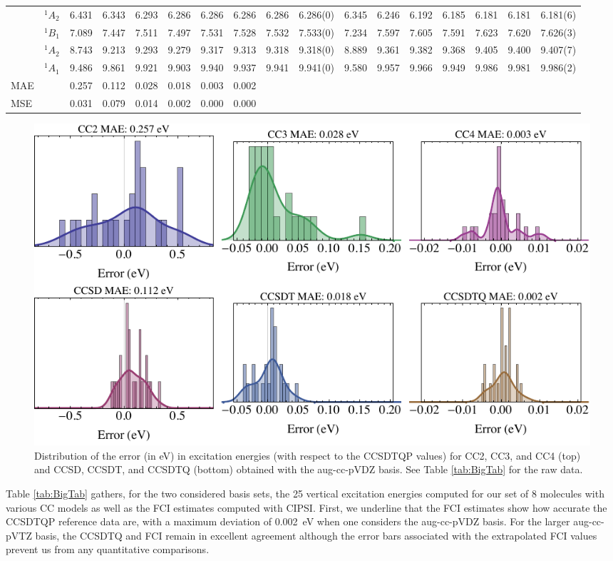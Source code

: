 \documentclass[aip,jcp,reprint,noshowkeys,superscriptaddress]{revtex4-1}
\begin{document}
\begin{squeezetable}
\begin{table}
\begin{ruledtabular}
\begin{tabular}{llrrrrrrrrrrrrrrr}
				&	$^1A_2$  		&6.431	&6.343	&6.293	&6.286	&6.286	&6.286	&6.286	&6.286(0)	&6.345	&6.246	&6.192	&6.185	&6.181	&6.181	&6.181(6) \\
	\ce{H2O}	&	$^1B_1$  		&7.089	&7.447	&7.511	&7.497	&7.531	&7.528	&7.532	&7.533(0)	&7.234	&7.597	&7.605	&7.591	&7.623	&7.620	&7.626(3)\\
				&	$^1A_2$  		&8.743	&9.213	&9.293	&9.279	&9.317	&9.313	&9.318	&9.318(0)	&8.889	&9.361	&9.382	&9.368	&9.405	&9.400	&9.407(7)\\
				&	$^1A_1$  		&9.486	&9.861	&9.921	&9.903	&9.940	&9.937	&9.941	&9.941(0)	&9.580	&9.957	&9.966	&9.949	&9.986	&9.981	&9.986(2)\\
	\hline
	MAE			&					&0.257	&0.112	&0.028	&0.018	&0.003	&0.002	\\
	MSE			&					&0.031	&0.079	&0.014	&0.002	&0.000	&0.000	\\
	\end{tabular}
	\end{ruledtabular}
\end{table}
\end{squeezetable}

\begin{figure}
	\includegraphics[width=\linewidth]{histograms_MAE_AVDZ}
	\caption{
	Distribution of the error (in eV) in excitation energies (with respect to the CCSDTQP values) for CC2, CC3, and CC4 (top) and CCSD, CCSDT, and CCSDTQ (bottom) obtained with the aug-cc-pVDZ basis.
	See Table \ref{tab:BigTab} for the raw data.
	\label{fig:error}}
\end{figure}

Table \ref{tab:BigTab} gathers, for the two considered basis sets, the 25 vertical excitation energies computed for our set of 8 molecules with various CC models as well as the FCI estimates computed with CIPSI.
First, we underline that the FCI estimates show how accurate the CCSDTQP reference data are, with a maximum deviation of \SI{0.002}{\eV} when one considers the aug-cc-pVDZ basis. 
For the larger aug-cc-pVTZ basis, the CCSDTQ and FCI remain in excellent agreement although the error bars associated with the extrapolated FCI values prevent us from any quantitative comparisons.
\end{document}
